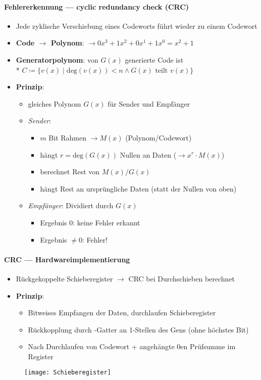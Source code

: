 \paragraph{Fehlererkennung --- cyclic redundancy check (CRC)}
\begin{itemize}
	\item Jede zyklische Verschiebung eines Codeworts führt wieder zu einem Codewort
  \item \textbf{Code \( \to \) Polynom}:  \( \to 0x^3+1x^2+0x^1+1x^0 = x^2+1 \)
  \item \textbf{Generatorpolynom}: von \( G(x) \) generierte Code ist \\* \( C \coloneqq \{ v(x) \mid \text{deg}(v(x)) < n \wedge G(x) \text{ teilt } v(x) \} \)
  \item \textbf{Prinzip}:
  \begin{itemize}
    \item gleiches Polynom \( G(x) \) für Sender und Empfänger
    \item \emph{Sender}:
    \begin{itemize}
      \item  \( m \) Bit Rahmen \( \to M(x) \) (Polynom/Codewort)
      \item hängt \( r = \text{deg}(G(x)) \) Nullen an Daten (\( \to x^r \cdot M(x) \))
      \item berechnet Rest von \( M(x)/G(x) \)
      \item hängt Rest an ursprüngliche Daten (statt der Nullen von oben)
    \end{itemize}
    \item \emph{Empfänger}: Dividiert durch \( G(x) \)
    \begin{itemize}
      \item Ergebnis \( 0 \): keine Fehler erkannt
      \item Ergebnis \( \neq 0 \): Fehler!
    \end{itemize}
  \end{itemize}
\end{itemize}

\paragraph{CRC --- Hardwareimplementierung}
\begin{itemize}
  \item Rückgekoppelte Schieberegister \( \to \) CRC bei Durchschieben berechnet
  \item \textbf{Prinzip}:
  \begin{itemize}
    \item Bitweises Empfangen der Daten, durchlaufen Schieberegister
    \item Rückkopplung durch -Gatter an 1-Stellen des Gens (ohne höchstes Bit)
    \item Nach Durchlaufen von Codewort + angehängte 0en Prüfsumme im Register
  \end{itemize}
\end{itemize}
\begin{figure}[H]\centering\label{Schieberegister}\texttt{[image: Schieberegister]}\end{figure}

